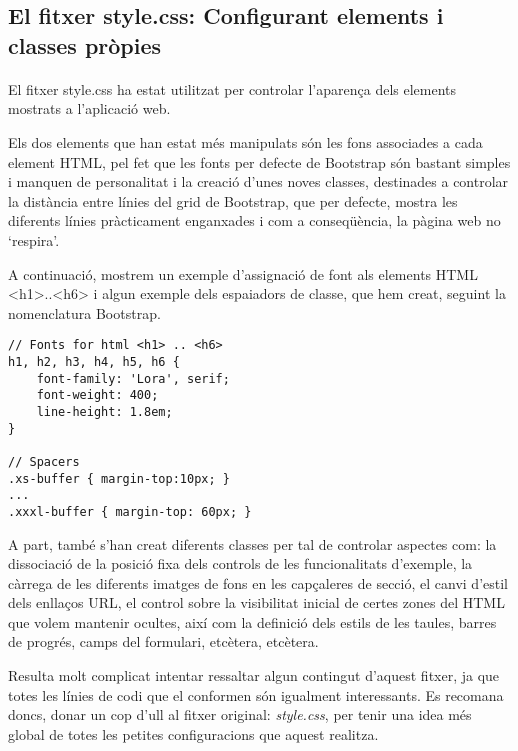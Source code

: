 \subsection{El fitxer style.css: Configurant elements i classes pròpies}

    \paragraph{}
    El fitxer style.css ha estat utilitzat per controlar l'aparença dels elements mostrats a l'aplicació web.

    Els dos elements que han estat més manipulats són les fons associades a cada element HTML, pel fet que les fonts per defecte de Bootstrap són bastant simples i manquen de personalitat i la creació d'unes noves classes, destinades a controlar la distància entre línies del grid de Bootstrap, que per defecte, mostra les diferents línies pràcticament enganxades i com a conseqüència, la pàgina web no `respira'.

    A continuació, mostrem un exemple d'assignació de font als elements HTML <h1>..<h6> i algun exemple dels espaiadors de classe, que hem creat, seguint la nomenclatura Bootstrap.

    \begin{lstlisting}[style=rawOwn,caption={Assignant fonts a elements HTML i creació d'espaiadors}]
// Fonts for html <h1> .. <h6>
h1, h2, h3, h4, h5, h6 {
    font-family: 'Lora', serif;
    font-weight: 400;
    line-height: 1.8em;
}

// Spacers
.xs-buffer { margin-top:10px; }
...
.xxxl-buffer { margin-top: 60px; }
    \end{lstlisting}

    A part, també s'han creat diferents classes per tal de controlar aspectes com: la dissociació de la posició fixa dels controls de les funcionalitats d'exemple, la càrrega de les diferents imatges de fons en les capçaleres de secció, el canvi d'estil dels enllaços URL, el control sobre la visibilitat inicial de certes zones del HTML que volem mantenir ocultes, així com la definició dels estils de les taules, barres de progrés, camps del formulari, etcètera, etcètera.

    Resulta molt complicat intentar ressaltar algun contingut d'aquest fitxer, ja que totes les línies de codi que el conformen són igualment interessants. Es recomana doncs, donar un cop d'ull al fitxer original: \emph{style.css}, per tenir una idea més global de totes les petites configuracions que aquest realitza.

